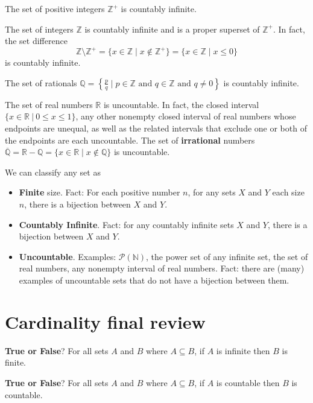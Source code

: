 \documentclass[12pt, oneside]{article}
\begin{document}
The set of positive integers $\mathbb{Z}^{+}$ is countably infinite.

The set of integers $\mathbb{Z}$ is countably infinite and is a proper superset of $\mathbb{Z}^{+}$. 
In fact, the set difference 
$$\mathbb{Z} \setminus \mathbb{Z}^{+} = \{ x \in \mathbb{Z} \mid x \notin \mathbb{Z}^+\} 
= \{ x \in \mathbb{Z} \mid x \leq 0 \}$$ is countably infinite.

The set of rationals 
$\mathbb{Q} = \left\{ \frac{p}{q} \mid p \in \mathbb{Z}  \text{ and  } 
q  \in \mathbb{Z} \text{ and } q \neq  0 \right\}$ is countably infinite.


The set of real numbers $\mathbb{R}$ is uncountable. In fact, the closed 
interval $\{x \in \mathbb{R} ~|~ 0 \leq x \leq 1\}$, 
any other nonempty closed interval of real numbers whose endpoints are 
unequal, as well as the related intervals that exclude one or both of the endpoints are
each uncountable.
The set of {\bf irrational} numbers $\overline{\mathbb{Q}} = \mathbb{R} - \mathbb{Q}
= \{ x \in \mathbb{R} \mid x \notin \mathbb{Q} \}$ is uncountable.

\vfill

We can classify any set as 
\begin{itemize}
\item {\bf Finite} size. Fact: For each positive number $n$, for any sets $X$ and $Y$ each 
size $n$, there is a bijection between $X$ and $Y$.
\item {\bf Countably Infinite}. Fact: for any countably infinite sets $X$ and $Y$, there is a bijection
between $X$ and $Y$.
\item {\bf Uncountable}. Examples: $\mathcal{P}(\mathbb{N})$, the power set of any infinite set, 
the set of real numbers, any nonempty interval of real numbers. Fact: there are (many) examples 
of uncountable sets that do not have a bijection between them.
\end{itemize} \vfill
\section*{Cardinality final review}


{\bf True or False}?  For all sets $A$ and $B$ where  $A \subseteq B$, 
if $A$ is infinite then $B$ is finite.

\vfill

{\bf True or False}?   For all sets $A$ and $B$ where  $A \subseteq B$, 
if $A$ is countable then $B$ is countable.

\vfill
\end{document}
